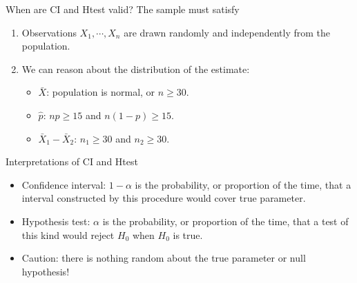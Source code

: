 \documentclass{beamer}
\newcommand{\ignore}[1]{}
\newcommand{\h}{\widehat}
\let\thefootnote\relax\footnotetext{\tiny{*  Office Hours: Wed \& Fri 10:00 - 11:30 AM, KMC 8-174}}
\begin{document}
\begin{frame}{When are CI and Htest valid?}
    The sample must satisfy
    \begin{enumerate}
        \item Observations $X_1,\cdots,X_n$ are drawn randomly and independently from the population.
        \item We can reason about the distribution of the estimate:
            \begin{itemize}
                \item $\bar X$: population is normal, or $n\geq 30$.
                \item $\h p$: $np \geq 15$ and $n (1-p)\geq 15$.
                \item $\bar X_1-\bar X_2$: $n_1\geq 30$ and $n_2\geq 30$.
            \end{itemize}
    \end{enumerate}
\end{frame}

\begin{frame}{Interpretations of CI and Htest}
\begin{itemize}
\item Confidence interval: $1-\alpha$ is the probability, or proportion of the time, that a interval constructed by this procedure would cover true parameter. 
\item Hypothesis test: $\alpha$ is the probability, or proportion of the time, that a test of this kind would reject $H_0$ when $H_0$ is true.
\item Caution: there is nothing random about the true parameter or null hypothesis!
\end{itemize}
\end{frame}



\ignore{
\begin{frame}{Time Series Plot}
\begin{figure}
    \caption{}
    \texttt{[image: figures/coindesk-bpi-chart]}
\end{figure}
\let\thefootnote\relax\footnotetext{\tiny{* Plot from Coindesk.com}}
\end{frame}

\begin{frame}{}
\begin{itemize}
\item 
\end{itemize}
\end{frame}

\vspace{\stretch{0.5}}

\begin{block}{}
\end{block}


}
\end{document}
